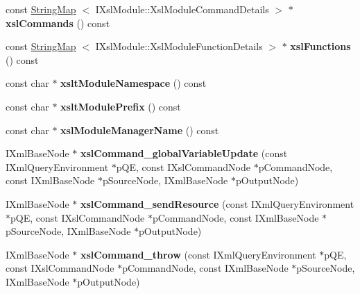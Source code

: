 \begin{DoxyCompactItemize}
\item 
\hypertarget{classgeneral__server_1_1Request_a73318628fb465877f93cccb92b833cbc}{const \hyperlink{classgeneral__server_1_1StringMap}{\-String\-Map}\*
$<$ \-I\-Xsl\-Module\-::\-Xsl\-Module\-Command\-Details $>$ $\ast$ {\bfseries xsl\-Commands} () const }\label{classgeneral__server_1_1Request_a73318628fb465877f93cccb92b833cbc}

\item 
\hypertarget{classgeneral__server_1_1Request_a8131b72855aacac4074a153452b372a0}{const \hyperlink{classgeneral__server_1_1StringMap}{\-String\-Map}\*
$<$ \-I\-Xsl\-Module\-::\-Xsl\-Module\-Function\-Details $>$ $\ast$ {\bfseries xsl\-Functions} () const }\label{classgeneral__server_1_1Request_a8131b72855aacac4074a153452b372a0}

\item 
\hypertarget{classgeneral__server_1_1Request_ada56ee278c966a2cf166c65837883a3b}{const char $\ast$ {\bfseries xslt\-Module\-Namespace} () const }\label{classgeneral__server_1_1Request_ada56ee278c966a2cf166c65837883a3b}

\item 
\hypertarget{classgeneral__server_1_1Request_aa5987a94d252364fcc7d2505c804d442}{const char $\ast$ {\bfseries xslt\-Module\-Prefix} () const }\label{classgeneral__server_1_1Request_aa5987a94d252364fcc7d2505c804d442}

\item 
\hypertarget{classgeneral__server_1_1Request_a9d15a24e73e2a70fd133625c7cd653c9}{const char $\ast$ {\bfseries xsl\-Module\-Manager\-Name} () const }\label{classgeneral__server_1_1Request_a9d15a24e73e2a70fd133625c7cd653c9}

\item 
\hypertarget{group__XSLModule-Commands_gae7356522b87a3d9d831581d48617bcc5}{\-I\-Xml\-Base\-Node $\ast$ {\bfseries xsl\-Command\-\_\-global\-Variable\-Update} (const \-I\-Xml\-Query\-Environment $\ast$p\-Q\-E, const \-I\-Xsl\-Command\-Node $\ast$p\-Command\-Node, const \-I\-Xml\-Base\-Node $\ast$p\-Source\-Node, \-I\-Xml\-Base\-Node $\ast$p\-Output\-Node)}\label{group__XSLModule-Commands_gae7356522b87a3d9d831581d48617bcc5}

\item 
\hypertarget{group__XSLModule-Commands_ga62b874e4b02db54a71d23c1dae1932bb}{\-I\-Xml\-Base\-Node $\ast$ {\bfseries xsl\-Command\-\_\-send\-Resource} (const \-I\-Xml\-Query\-Environment $\ast$p\-Q\-E, const \-I\-Xsl\-Command\-Node $\ast$p\-Command\-Node, const \-I\-Xml\-Base\-Node $\ast$p\-Source\-Node, \-I\-Xml\-Base\-Node $\ast$p\-Output\-Node)}\label{group__XSLModule-Commands_ga62b874e4b02db54a71d23c1dae1932bb}

\item 
\hypertarget{group__XSLModule-Commands_ga027f59c9cf28596905d61af8a9dd08b1}{\-I\-Xml\-Base\-Node $\ast$ {\bfseries xsl\-Command\-\_\-throw} (const \-I\-Xml\-Query\-Environment $\ast$p\-Q\-E, const \-I\-Xsl\-Command\-Node $\ast$p\-Command\-Node, const \-I\-Xml\-Base\-Node $\ast$p\-Source\-Node, \-I\-Xml\-Base\-Node $\ast$p\-Output\-Node)}\label{group__XSLModule-Commands_ga027f59c9cf28596905d61af8a9dd08b1}

\end{DoxyCompactItemize}
